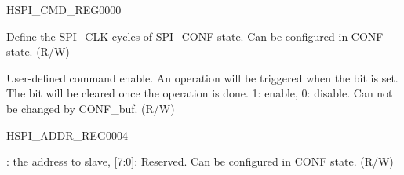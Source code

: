 \begin{register}{H}{SPI\_CMD\_REG}{\hexprefix{}0000}\label{regdesc:SPICMDREG}
%
%
%
%
\regnewline%
\begin{regdesc}\begin{reglist}
\label{fielddesc:SPICONFBITLEN}\item [SPI\_CONF\_BITLEN] Define the SPI\_CLK cycles of  SPI\_CONF state. Can be configured in CONF state. (R/W)
\label{fielddesc:SPIUSR}\item [SPI\_USR] User-defined command enable. An operation will be triggered when the bit is set. The bit will be cleared once the operation is done. 1: enable, 0: disable. Can not be changed by CONF\_buf. (R/W)
\end{reglist}\end{regdesc}
\end{register}


\begin{register}{H}{SPI\_ADDR\_REG}{\hexprefix{}0004}\label{regdesc:SPIADDRREG}
%
\regnewline%
\begin{regdesc}\begin{reglist}
\label{fielddesc:SPIUSRADDRVALUE}\item [SPI\_USR\_ADDR\_VALUE] [31:8]: the address to slave, [7:0]: Reserved. Can be configured in CONF state. (R/W)
\end{reglist}\end{regdesc}
\end{register}


